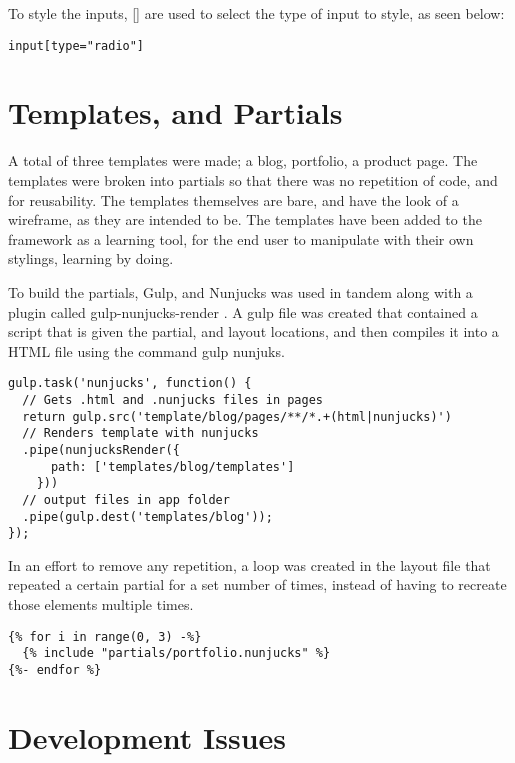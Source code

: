 To style the inputs, [] are used to select the type of input to style, as seen below: 

\begin{lstlisting}[language=CSS3]
input[type="radio"]
\end{lstlisting}

\newpage
{}
\section*{Templates, and Partials}

A total of three templates were made; a blog, portfolio, a product page. The templates were broken into partials so that there was no repetition of code, and for reusability. The templates themselves are bare, and have the look of a wireframe, as they are intended to be. The templates have been added to the framework as a learning tool, for the end user to manipulate with their own stylings, learning by doing. 

To build the partials, Gulp, and Nunjucks was used in tandem along with a plugin called gulp-nunjucks-render \citep*{PLUG17} . A gulp file was created that contained a script that is given the partial, and layout locations, and then compiles it into a \gls{HTML} file using the command gulp nunjuks.

\begin{lstlisting}[language=CSS3]
gulp.task('nunjucks', function() {
  // Gets .html and .nunjucks files in pages
  return gulp.src('template/blog/pages/**/*.+(html|nunjucks)')
  // Renders template with nunjucks
  .pipe(nunjucksRender({
      path: ['templates/blog/templates']
    }))
  // output files in app folder
  .pipe(gulp.dest('templates/blog'));
});

\end{lstlisting}

In an effort to remove any repetition, a loop was created in the layout file that repeated a certain partial for a set number of times, instead of having to recreate those elements multiple times. 

\begin{lstlisting}[language=CSS3]
{% for i in range(0, 3) -%}
  {% include "partials/portfolio.nunjucks" %}
{%- endfor %}
\end{lstlisting}


\newpage
\section*{Development Issues}


